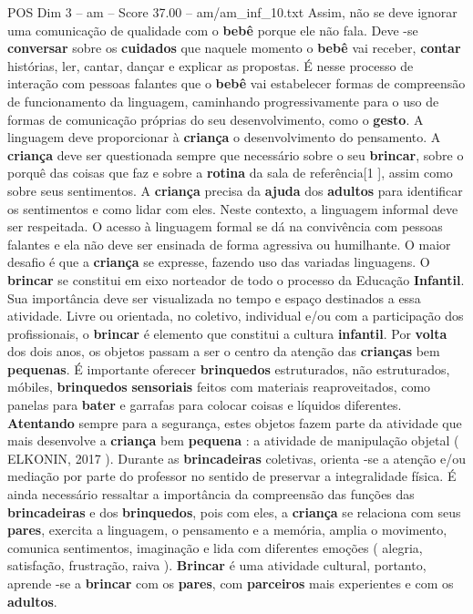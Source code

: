 \begin{textsample}{POS Dim 3 – am – Score 37.00 – am/am\_inf\_10.txt}
Assim, não se deve ignorar uma comunicação de qualidade com o \textbf{bebê} porque ele não fala.
Deve -se \textbf{conversar} sobre os \textbf{cuidados} que naquele momento o \textbf{bebê} vai receber, \textbf{contar} histórias, ler, cantar, dançar e explicar as propostas.
É nesse processo de interação com pessoas falantes que o \textbf{bebê} vai estabelecer formas de compreensão de funcionamento da linguagem, caminhando progressivamente para o uso de formas de comunicação próprias do seu desenvolvimento, como o \textbf{gesto}.
A linguagem deve proporcionar à \textbf{criança} o desenvolvimento do pensamento.
A \textbf{criança} deve ser questionada sempre que necessário sobre o seu \textbf{brincar}, sobre o porquê das coisas que faz e sobre a \textbf{rotina} da sala de referência[1 ], assim como sobre seus sentimentos.
A \textbf{criança} precisa da \textbf{ajuda} dos \textbf{adultos} para identificar os sentimentos e como lidar com eles.
Neste contexto, a linguagem informal deve ser respeitada.
O acesso à linguagem formal se dá na convivência com pessoas falantes e ela não deve ser ensinada de forma agressiva ou humilhante.
O maior desafio é que a \textbf{criança} se expresse, fazendo uso das variadas linguagens.
O \textbf{brincar} se constitui em eixo norteador de todo o processo da Educação \textbf{Infantil}.
Sua importância deve ser visualizada no tempo e espaço destinados a essa atividade.
Livre ou orientada, no coletivo, individual e/ou com a participação dos profissionais, o \textbf{brincar} é elemento que constitui a cultura \textbf{infantil}.
Por \textbf{volta} dos dois anos, os objetos passam a ser o centro da atenção das \textbf{crianças} bem \textbf{pequenas}.
É importante oferecer \textbf{brinquedos} estruturados, não estruturados, móbiles, \textbf{brinquedos} \textbf{sensoriais} feitos com materiais reaproveitados, como panelas para \textbf{bater} e garrafas para colocar coisas e líquidos diferentes. \textbf{Atentando} sempre para a segurança, estes objetos fazem parte da atividade que mais desenvolve a \textbf{criança} bem \textbf{pequena} : a atividade de manipulação objetal ( ELKONIN, 2017 ).
Durante as \textbf{brincadeiras} coletivas, orienta -se a atenção e/ou mediação por parte do professor no sentido de preservar a integralidade física.
É ainda necessário ressaltar a importância da compreensão das funções das \textbf{brincadeiras} e dos \textbf{brinquedos}, pois com eles, a \textbf{criança} se relaciona com seus \textbf{pares}, exercita a linguagem, o pensamento e a memória, amplia o movimento, comunica sentimentos, imaginação e lida com diferentes emoções ( alegria, satisfação, frustração, raiva ). \textbf{Brincar} é uma atividade cultural, portanto, aprende -se a \textbf{brincar} com os \textbf{pares}, com \textbf{parceiros} mais experientes e com os \textbf{adultos}.

\end{textsample}
